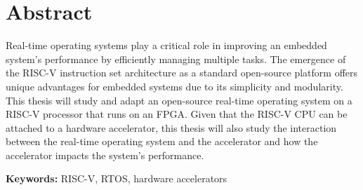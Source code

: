 
\section*{Abstract}


Real-time operating systems play a critical role in improving an embedded system's performance by efficiently managing multiple tasks. The emergence of the RISC-V instruction set architecture as a standard open-source platform offers unique advantages for embedded systems due to its simplicity and modularity. This thesis will study and adapt an open-source real-time operating system on a RISC-V processor that runs on an FPGA. Given that the RISC-V CPU can be attached to a hardware accelerator, this thesis will also study the interaction between the real-time operating system and the accelerator and how the accelerator impacts the system's performance.


\vfill

\textbf{\Large Keywords:} RISC-V, RTOS, hardware accelerators

